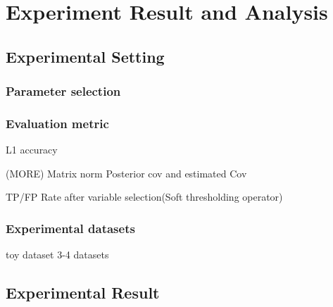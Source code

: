 \chapter{Experiment Result and Analysis}
\label{Chapter4}
\section{Experimental Setting}
\subsection{Parameter selection}
\subsection{Evaluation metric}
L1 accuracy

(MORE) Matrix norm Posterior cov and estimated Cov

TP/FP Rate after variable selection(Soft thresholding operator)

\subsection{Experimental datasets}
toy dataset
3-4 datasets
\section{Experimental Result}

